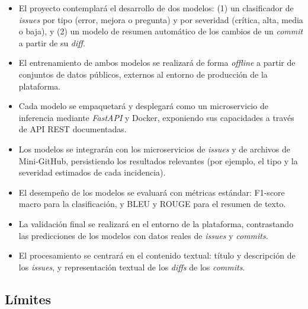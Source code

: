 \begin{itemize}
  \item El proyecto contemplará el desarrollo de dos modelos: (1) un clasificador de \textit{issues} por tipo (error, mejora o pregunta) y por severidad (crítica, alta, media o baja), y (2) un modelo de resumen automático de los cambios de un \textit{commit} a partir de su \textit{diff}.

  \item El entrenamiento de ambos modelos se realizará de forma \textit{offline} a partir de conjuntos de datos públicos, externos al entorno de producción de la plataforma.

  \item Cada modelo se empaquetará y desplegará como un microservicio de inferencia mediante \textit{FastAPI} y Docker, exponiendo sus capacidades a través de \acrshort{API} \acrshort{REST} documentadas.

  \item Los modelos se integrarán con los microservicios de \textit{issues} y de archivos de Mini-GitHub, persistiendo los resultados relevantes (por ejemplo, el tipo y la severidad estimados de cada incidencia).

  \item El desempeño de los modelos se evaluará con métricas estándar: F1-score macro para la clasificación, y BLEU y ROUGE para el resumen de texto.

  \item La validación final se realizará en el entorno de la plataforma, contrastando las predicciones de los modelos con datos reales de \textit{issues} y \textit{commits}.

  \item El procesamiento se centrará en el contenido textual: título y descripción de los \textit{issues}, y representación textual de los \textit{diffs} de los \textit{commits}.
\end{itemize}

\subsection{Límites}

